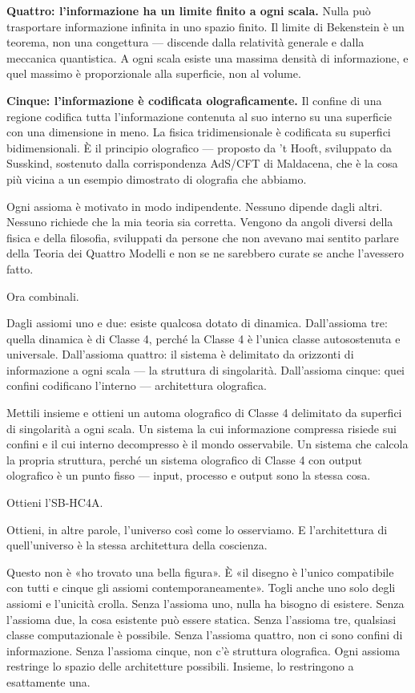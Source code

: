 \documentclass[11pt, twoside, openright]{book}
\begin{document}
\textbf{Quattro: l'informazione ha un limite finito a ogni scala.} Nulla può trasportare informazione infinita in uno spazio finito. Il limite di Bekenstein è un teorema, non una congettura --- discende dalla relatività generale e dalla meccanica quantistica. A ogni scala esiste una massima densità di informazione, e quel massimo è proporzionale alla superficie, non al volume.

\textbf{Cinque: l'informazione è codificata olograficamente.} Il confine di una regione codifica tutta l'informazione contenuta al suo interno su una superficie con una dimensione in meno. La fisica tridimensionale è codificata su superfici bidimensionali. È il principio olografico --- proposto da 't Hooft, sviluppato da Susskind, sostenuto dalla corrispondenza AdS/\allowbreak{}CFT di Maldacena, che è la cosa più vicina a un esempio dimostrato di olografia che abbiamo.

Ogni assioma è motivato in modo indipendente. Nessuno dipende dagli altri. Nessuno richiede che la mia teoria sia corretta. Vengono da angoli diversi della fisica e della filosofia, sviluppati da persone che non avevano mai sentito parlare della Teoria dei Quattro Modelli e non se ne sarebbero curate se anche l'avessero fatto.

Ora combinali.

Dagli assiomi uno e due: esiste qualcosa dotato di dinamica. Dall'assioma tre: quella dinamica è di Classe 4, perché la Classe 4 è l'unica classe autosostenuta e universale. Dall'assioma quattro: il sistema è delimitato da orizzonti di informazione a ogni scala --- la struttura di singolarità. Dall'assioma cinque: quei confini codificano l'interno --- architettura olografica.

Mettili insieme e ottieni un automa olografico di Classe 4 delimitato da superfici di singolarità a ogni scala. Un sistema la cui informazione compressa risiede sui confini e il cui interno decompresso è il mondo osservabile. Un sistema che calcola la propria struttura, perché un sistema olografico di Classe 4 con output olografico è un punto fisso --- input, processo e output sono la stessa cosa.

Ottieni l'SB-HC4A.

Ottieni, in altre parole, l'universo così come lo osserviamo. E l'architettura di quell'universo è la stessa architettura della coscienza.

Questo non è «ho trovato una bella figura». È «il disegno è l'unico compatibile con tutti e cinque gli assiomi contemporaneamente». Togli anche uno solo degli assiomi e l'unicità crolla. Senza l'assioma uno, nulla ha bisogno di esistere. Senza l'assioma due, la cosa esistente può essere statica. Senza l'assioma tre, qualsiasi classe computazionale è possibile. Senza l'assioma quattro, non ci sono confini di informazione. Senza l'assioma cinque, non c'è struttura olografica. Ogni assioma restringe lo spazio delle architetture possibili. Insieme, lo restringono a esattamente una.
\end{document}
